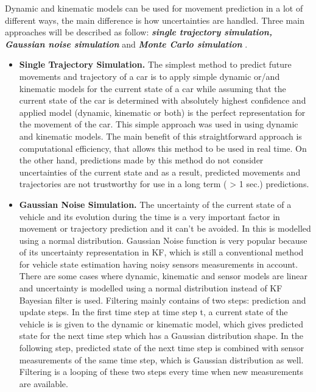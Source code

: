Dynamic and kinematic models can be used for movement prediction in a lot of different ways, the main difference is how uncertainties are handled. Three main approaches will be described as follow: \textbf{\textit{single trajectory simulation, Gaussian noise simulation}} and \textbf{\textit{Monte Carlo simulation}} \cite{ClassificationI}.

\begin{itemize}
	\item \textbf{Single Trajectory Simulation.} The simplest method to predict future movements and trajectory of a car is to apply simple dynamic or/and kinematic models for the current state of a car while assuming that the current state of the car is determined with absolutely highest confidence and applied model (dynamic, kinematic or both) is the perfect representation for the movement of the car. This simple approach was used in \cite{dynamic} using dynamic and \cite{kinematicI, kinematicII} kinematic models. The main benefit of this straightforward approach is computational efficiency, that allows this method to be used in real time. On the other hand, predictions made by this method do not consider uncertainties of the current state and as a result, predicted movements and trajectories are not trustworthy for use in a long term ( > 1 sec.) predictions.
	\item \textbf{Gaussian Noise Simulation.} The uncertainty of the current state of a vehicle and its evolution during the time is a very important factor in movement or trajectory prediction and it can't be avoided. In \cite{GaussianNoiseI, GaussianNoiseII, kinematicII} this is modelled using a normal distribution. Gaussian Noise function is very popular because of its uncertainty representation in \gls{KF}, which is still a conventional method for vehicle state estimation having noisy sensors measurements in account. There are some cases where dynamic, kinematic and sensor models are linear and uncertainty is modelled using a normal distribution instead of \gls{KF} Bayesian filter is used. Filtering mainly contains of two steps: prediction and update steps. In the first time step at time step t, a current state of the vehicle is is given to the dynamic or kinematic model, which gives predicted state for the next time step which has a Gaussian distribution shape. In the following step, predicted state of the next time step is combined with sensor measurements of the same time step, which is Gaussian distribution as well. Filtering is a looping of these two steps every time when new measurements are available.
	

\end{itemize}
